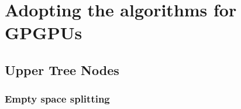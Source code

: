 




\section{Adopting the algorithms for GPGPUs}





\subsection{Upper Tree Nodes}\label{sec:upperNodes}








\subsubsection{Empty space splitting}\label{sec:gpuEmptySpace}

